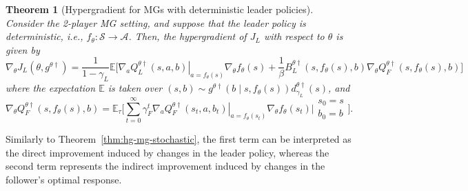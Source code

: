 \documentclass[letterpaper]{article} %
\providecommand{\E}{\mathbb{E}} %
\newtheorem{theorem}{Theorem}
\begin{document}
\begin{theorem}[Hypergradient for MGs with deterministic leader policies]
\label{thm:hg-mg-deterministic}
Consider the 2-player MG setting, and suppose that the leader policy is deterministic, i.e., $f_{\theta}:\mathcal{S}\to\mathcal{A}$.
Then, the hypergradient of $J_L$ with respect to $\theta$ is given by
\begin{equation}
    \nabla_{\theta}J_L({\theta}, g^{\theta\dagger})
    =\dfrac{1}{1-\gamma_L}\E\bigg[\left.\nabla_a Q_L^{{\theta}\dagger}(s,a,b)\right|_{a=f_{\theta}(s)}\nabla_{\theta}f_{\theta}(s)
    +\dfrac{1}{\beta} B_L^{{\theta}\dagger}(s,f_{\theta}(s),b) \nabla_{\theta}Q_F^{\theta\dagger}(s,f_{\theta}(s),b)\bigg]\label{eq:hg_MG_det}
\end{equation}
where the expectation $\E$ is taken over
$(s,b)\sim g^{{\theta}\dagger}(b\mid s,f_{\theta}(s))
d_{\gamma_L}^{\theta\dagger}(s)$, and
\begin{equation}
    \nabla_{\theta}Q_F^{\theta\dagger}(s,f_{\theta}(s),b) \label{eq:nablaQF_MG_det}
    =\E_{\tau}\Bigg[\sum_{t=0}^\infty \gamma_F^t
    \left.\nabla_a Q_F^{\theta\dag}(s_t,a,b_t)\right|_{a=f_{\theta}(s_t)}\nabla_{\theta}f_{\theta}(s_t)\Bigg|\begin{array}{l}s_0=s\\b_0=b\end{array}\Bigg].
\end{equation}
\end{theorem}

Similarly to Theorem~\ref{thm:hg-mg-stochastic}, the first term can be interpreted as the direct improvement induced by changes in the leader policy, whereas the second term represents the indirect improvement induced by changes in the follower's optimal response.
\end{document}

